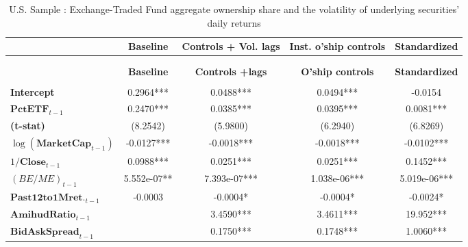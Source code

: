 {\scriptsize\tabcolsep=3pt
\begin{longtable}{>{\bfseries}lcccc}
\toprule
& \textbf{Baseline}  & \textbf{Controls + Vol. lags} & \textbf{Inst. o'ship controls} & \textbf{Standardized}  \\
\midrule
\endhead
\caption{U.S. Sample : Exchange-Traded Fund aggregate ownership share and the volatility of underlying securities' daily returns}\\
\label{tab:short:Volatility:US:Comp}\\
\toprule
& \textbf{Baseline}  & \textbf{Controls +lags} & \textbf{O'ship controls} & \textbf{Standardized}  \\
\midrule
\endfirsthead
\bottomrule
\multicolumn{5}{r}{\textit{Continues on next page}}\\
\endfoot
\bottomrule
\endlastfoot
Intercept                         &       0.2964***       &             0.0488***            &             0.0494***             &        -0.0154         \\
\rowcolor{blue!20}
$\mathbf{PctETF}_{t-1}$            &       0.2470***       &             0.0385***            &             0.0395***             &         0.0081***         \\
(t-stat)        &      (8.2542)      &            (5.9800)           &            (6.2940)            &        (6.8269)        \\
$\log(\mathbf{MarketCap}_{t-1})$    &      -0.0127***       &            -0.0018***            &            -0.0018***             &        -0.0102***         \\
$1/\mathbf{Close}_{t-1}$                    &       0.0988***       &             0.0251***            &             0.0251***             &         0.1452*** \\
$\left(BE/ME\right)_{t-1}$           &     5.552e-07**      &           7.393e-07***           &           1.038e-06***            &       5.019e-06***        \\
$\mathbf{Past 12 to 1M ret.}_{t-1}$               &      -0.0003       &            -0.0004*            &            -0.0004*             &        -0.0024*   \\
$\mathbf{AmihudRatio}_{t-1}$                 &                    &             3.4590***            &             3.4611***             &         19.952***         \\
$\mathbf{BidAskSpread}_{t-1}$             &                    &             0.1750***            &             0.1748***             &         1.0060***         \\

\end{longtable}}
